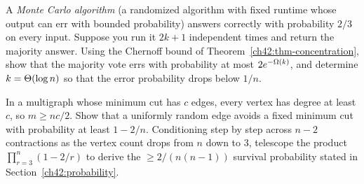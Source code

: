 \begin{exercise}
A \emph{Monte Carlo algorithm} (a randomized algorithm with fixed runtime whose output can err with bounded probability) answers correctly with probability $2/3$ on every input. Suppose you run it $2k+1$ independent times and return the majority answer. Using the Chernoff bound of Theorem~\ref{ch42:thm-concentration}, show that the majority vote errs with probability at most $2e^{-\Omega(k)}$, and determine $k = \Theta(\log n)$ so that the error probability drops below $1/n$.
\end{exercise}

\begin{exercise}
\label{ch42:ex-karger-warmup}
In a multigraph whose minimum cut has $c$ edges, every vertex has degree at least $c$, so $m \ge nc/2$. Show that a uniformly random edge avoids a fixed minimum cut with probability at least $1 - 2/n$. Conditioning step by step across $n-2$ contractions as the vertex count drops from $n$ down to $3$, telescope the product $\prod_{r=3}^n (1 - 2/r)$ to derive the $\ge 2/(n(n-1))$ survival probability stated in Section~\ref{ch42:probability}.
\end{exercise}
